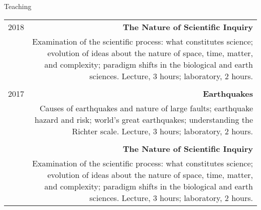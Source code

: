 \begin{rSection}{Teaching}
	\begin{tabular}{L!{\VRule}R}
		2018 & \textbf{The Nature of Scientific Inquiry} \\
		& Examination of the scientific process: what constitutes science; evolution of ideas about the nature of space, time, matter, and complexity; paradigm shifts in the biological and earth sciences. Lecture, 3 hours; laboratory, 2 hours. \\ \\
	
		2017 & \textbf{Earthquakes} \\
		& Causes of earthquakes and nature of large faults; earthquake hazard and risk; world's great earthquakes; understanding the Richter scale. Lecture, 3 hours; laboratory, 2 hours.\\ \\
		
		& \textbf{The Nature of Scientific Inquiry} \\
		& Examination of the scientific process: what constitutes science; evolution of ideas about the nature of space, time, matter, and complexity; paradigm shifts in the biological and earth sciences. Lecture, 3 hours; laboratory, 2 hours.
	\end{tabular}
\end{rSection}